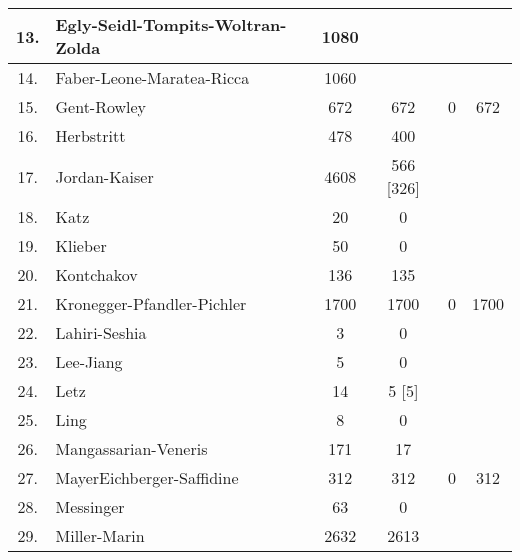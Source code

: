 \documentclass[runningheads]{llncs}
\begin{document}
\begin{table}
\begin{tabular}{c|l|c|c|c|c}
13. & Egly-Seidl-Tompits-Woltran-Zolda &  1080 &  &  &  \\ \hline

14. & Faber-Leone-Maratea-Ricca &  1060 &  &  &  \\ \hline 

15. & Gent-Rowley &  672 & 672 & 0 & 672 \\ \hline

16. & Herbstritt &  478 & 400 &  &  \\ \hline

17. & Jordan-Kaiser &  4608 & 566 [326] &  &  \\\hline

18. & Katz &  20 & 0 &  &  \\ \hline

19. & Klieber & 50 & 0 &  &  \\ \hline

20. & Kontchakov&  136 & 135 &  &  \\ \hline

21. & Kronegger-Pfandler-Pichler &  1700 & 1700  & 0  & 1700 \\ \hline 

22. & Lahiri-Seshia & 3 & 0 &  &  \\ \hline

23. & Lee-Jiang &  5 &  0 &  &  \\ \hline

24. & Letz & 14 & 5 [5]  &  &  \\\hline

25. & Ling &  8 & 0 &  &  \\ \hline

26. & Mangassarian-Veneris &  171 & 17 &  &  \\ \hline

27. & MayerEichberger-Saffidine &  312 & 312 & 0 & 312 \\\hline

28. & Messinger &  63 & 0 &  &  \\ \hline

29. & Miller-Marin & 2632 & 2613 &  &  \\ \hline


\end{tabular}
\end{table}
\end{document}
